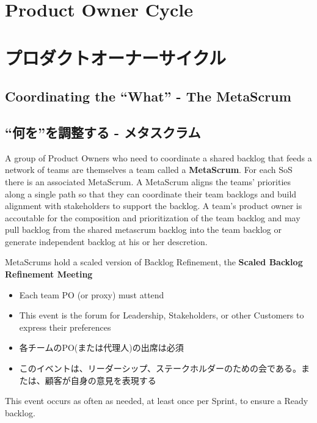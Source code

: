 \documentclass[12pt,a4paper,parskip=full]{scrartcl}
\begin{document}
\section{Product Owner Cycle}
\fi
\section{プロダクトオーナーサイクル}
\subsection{Coordinating the ``What'' - The MetaScrum}
\fi
\subsection{``何を''を調整する - メタスクラム}
A group of Product Owners who need to coordinate a shared backlog that
feeds a network of teams are themselves a team called a \textbf{MetaScrum}.
For each SoS there is an associated MetaScrum. A MetaScrum aligns the
teams' priorities along a single path so that they can coordinate their
team backlogs and build alignment with stakeholders to support the backlog.
A team's product owner is accoutable for the composition and prioritization
of the team backlog and may pull backlog from the shared metascrum backlog
into the team backlog or generate independent backlog at his or her descretion.

MetaScrums hold a scaled version of Backlog Refinement, the \textbf{Scaled Backlog Refinement Meeting} 
\begin{itemize}
\item Each team PO (or proxy) must attend
\item This event is the forum for Leadership, Stakeholders, or other
Customers to express their preferences
\end{itemize}
\fi
\begin{itemize}
\item 各チームのPO(または代理人)の出席は必須
\item このイベントは、リーダーシップ、ステークホルダーのための会である。または、顧客が自身の意見を表現する
\end{itemize}
This event occurs as often as needed, at least once per Sprint, to ensure a
Ready backlog. 
\end{document}
